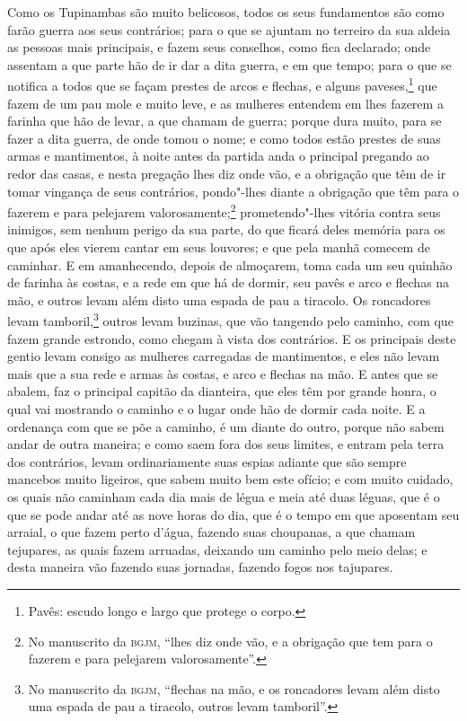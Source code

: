 Como os Tupinambas são muito belicosos, todos os seus fundamentos são como farão guerra
aos seus contrários; para o que se ajuntam no terreiro da sua aldeia as pessoas mais
principais, e fazem seus conselhos, como fica declarado; onde assentam a que parte hão de
ir dar a dita guerra, e em que tempo; para o que se notifica a todos que se façam prestes
de arcos e flechas, e alguns paveses,\footnote{ Pavês: escudo longo e largo que protege o
corpo.} que fazem de um pau mole e muito leve, e as mulheres entendem em lhes fazerem a
farinha que hão de levar, a que chamam de guerra; porque dura muito, para se fazer a dita
guerra, de onde tomou o nome; e como todos estão prestes de suas armas e mantimentos, à
noite antes da partida anda o principal pregando ao redor das casas, e nesta pregação lhes
diz onde vão, e a obrigação que têm de ir tomar vingança de seus contrários, pondo"-lhes
diante a obrigação que têm para o fazerem e para pelejarem valorosamente;\footnote{ No
manuscrito da \textsc{bgjm}, ``lhes diz onde vão, e a obrigação que tem para o fazerem e
para pelejarem valorosamente''.} prometendo"-lhes vitória contra seus inimigos, sem nenhum
perigo da sua parte, do que ficará deles memória para os que após eles vierem cantar em
seus louvores; e que pela manhã comecem de caminhar. E em amanhecendo, depois de
almoçarem, toma cada um seu quinhão de farinha às costas, e a rede em que há de dormir,
seu pavês e arco e flechas na mão, e outros levam além disto uma espada de pau a tiracolo.
Os roncadores levam tamboril,\footnote{ No manuscrito da \textsc{bgjm}, ``flechas na mão,
e os roncadores levam além disto uma espada de pau a tiracolo, outros levam tamboril''.}
outros levam buzinas, que vão tangendo pelo caminho, com que fazem grande estrondo, como
chegam à vista dos contrários. E os principais deste gentio levam consigo as mulheres
carregadas de mantimentos, e eles não levam mais que a sua rede e armas às costas, e arco
e flechas na mão. E antes que se abalem, faz o principal capitão da dianteira, que eles
têm por grande honra, o qual vai mostrando o caminho e o lugar onde hão de dormir cada
noite. E a ordenança com que se põe a caminho, é um diante do outro, porque não sabem
andar de outra maneira; e como saem fora dos seus limites, e entram pela terra dos
contrários, levam ordinariamente suas espias adiante que são sempre mancebos muito
ligeiros, que sabem muito bem este ofício; e com muito cuidado, os quais não caminham cada
dia mais de légua e meia até duas léguas, que é o que se pode andar até as nove horas do
dia, que é o tempo em que aposentam seu arraial, o que fazem perto d'água, fazendo suas
choupanas, a que chamam tejupares, as quais fazem arruadas, deixando um caminho pelo meio
delas; e desta maneira vão fazendo suas jornadas, fazendo fogos nos tajupares.

